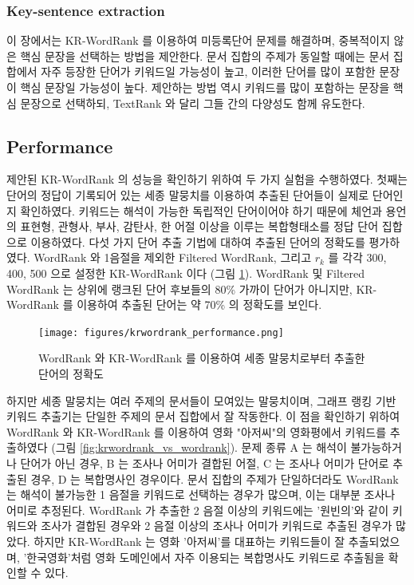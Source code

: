 \documentclass[11pt]{article}
\begin{document}
\subsubsection{Key-sentence extraction}

이 장에서는 KR-WordRank 를 이용하여 미등록단어 문제를 해결하며, 중복적이지 않은 핵심 문장을 선택하는 방법을 제안한다.
문서 집합의 주제가 동일할 때에는 문서 집합에서 자주 등장한 단어가 키워드일 가능성이 높고, 이러한 단어를 많이 포함한 문장이 핵심 문장일 가능성이 높다.
제안하는 방법 역시 키워드를 많이 포함하는 문장을 핵심 문장으로 선택하되, TextRank 와 달리 그들 간의 다양성도 함께 유도한다.

\vspace{3cm}


\subsection{Performance}

제안된 KR-WordRank 의 성능을 확인하기 위하여 두 가지 실험을 수행하였다.
첫째는 단어의 정답이 기록되어 있는 세종 말뭉치를 이용하여 추출된 단어들이 실제로 단어인지 확인하였다.
키워드는 해석이 가능한 독립적인 단어이어야 하기 때문에 체언과 용언의 표현형, 관형사, 부사, 감탄사, 한 어절 이상을 이루는 복합형태소를 정답 단어 집합으로 이용하였다.
다섯 가지 단어 추출 기법에 대하여 추출된 단어의 정확도를 평가하였다.
WordRank 와 1음절을 제외한 Filtered WordRank, 그리고 $r_k$ 를 각각 300, 400, 500 으로 설정한 KR-WordRank 이다 (그림 \ref{fig:krwordrank_performance}).
WordRank 및 Filtered WordRank 는 상위에 랭크된 단어 후보들의 80\% 가까이 단어가 아니지만, KR-WordRank 를 이용하여 추출된 단어는 약 70\% 의 정확도를 보인다.

\begin{figure}[H]
\centering
\label{fig:krwordrank_performance}
\texttt{[image: figures/krwordrank\_performance.png]}
\caption{WordRank 와 KR-WordRank 를 이용하여 세종 말뭉치로부터 추출한 단어의 정확도}
\end{figure}

하지만 세종 말뭉치는 여러 주제의 문서들이 모여있는 말뭉치이며, 그래프 랭킹 기반 키워드 추출기는 단일한 주제의 문서 집합에서 잘 작동한다.
이 점을 확인하기 위하여 WordRank 와 KR-WordRank 를 이용하여 영화 "아저씨"의 영화평에서 키워드를 추출하였다 (그림 \ref{fig:krwordrank_vs_wordrank}).
문제 종류 A 는 해석이 불가능하거나 단어가 아닌 경우, B 는 조사나 어미가 결합된 어절, C 는 조사나 어미가 단어로 추출된 경우, D 는 복합명사인 경우이다.
문서 집합의 주제가 단일하더라도 WordRank 는 해석이 불가능한 1 음절을 키워드로 선택하는 경우가 많으며, 이는 대부분 조사나 어미로 추정된다.
WordRank 가 추출한 2 음절 이상의 키워드에는 '원빈의'와 같이 키워드와 조사가 결합된 경우와 2 음절 이상의 조사나 어미가 키워드로 추출된 경우가 많았다.
하지만 KR-WordRank 는 영화 '아저씨'를 대표하는 키워드들이 잘 추출되었으며, '한국영화'처럼 영화 도메인에서 자주 이용되는 복합명사도 키워드로 추출됨을 확인할 수 있다.
\end{document}
